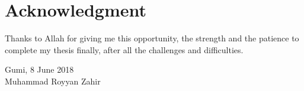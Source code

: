 \chapter*{Acknowledgment}
Thanks to Allah for giving me this opportunity, the strength and the patience to complete my thesis finally, after all the challenges and difficulties.



\vspace*{0.1cm}
\begin{flushright}
	Gumi, 8 June 2018\\[0.1cm]
	\vspace*{1cm}
	Muhammad Royyan Zahir
\end{flushright}